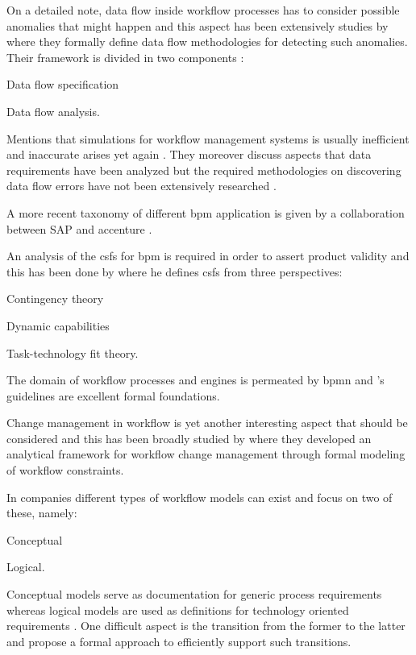 \documentclass[draft=false]{seal_thesis}
\begin{document}
On a detailed note, data flow inside workflow processes has to consider possible anomalies that might happen and this aspect has been extensively studies by \citet{Sun2006} where they formally define data flow methodologies for detecting such anomalies. Their framework is divided in two components \citep{Sun2006}:
\begin{enumerate*}
	\item Data flow specification
	\item Data flow analysis.
\end{enumerate*}

Mentions that simulations for workflow management systems is usually inefficient and inaccurate arises yet again \citep{Sun2006}. They moreover discuss aspects that data requirements have been analyzed but the required methodologies on discovering data flow errors have not been extensively researched \citep{Sun2006}.

A more recent taxonomy of different \gls{bpm} application is given by a collaboration between SAP and accenture \citep{EvolvedTechnologist2009}.

An analysis of the \glspl{csf} for \gls{bpm} is required in order to assert product validity and this has been done by \citet{Trkman2010} where he defines \glspl{csf} from three perspectives:
\begin{enumerate*}
	\item Contingency theory
	\item Dynamic capabilities
	\item Task-technology fit theory.
\end{enumerate*}

The domain of workflow processes and engines is permeated by \gls{bpmn} and \citet{Silver2011}'s guidelines are excellent formal foundations.

Change management in workflow is yet another interesting aspect that should be considered and this has been broadly studied by \citet{Wang2011} where they developed an analytical framework for workflow change management through formal modeling of workflow constraints.

In companies different types of workflow models can exist and \citet{Fan2012} focus on two of these, namely:
\begin{enumerate*}
	\item Conceptual
	\item Logical.
\end{enumerate*}

Conceptual models serve as documentation for generic process requirements whereas logical models are used as definitions for technology oriented requirements \citep{Fan2012}. One difficult aspect is the transition from the former to the latter and \citet{Fan2012} propose a formal approach to efficiently support such transitions.
\end{document}
